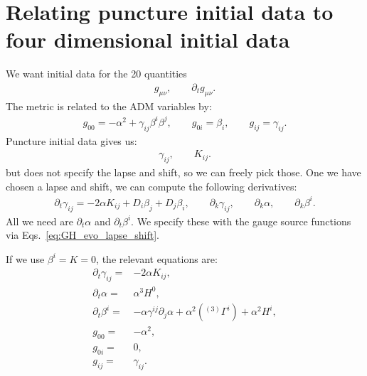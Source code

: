 \documentclass[%
notitlepage,
report,
nofootinbib,
 amsmath,amssymb,
 aps,
]{revtex4-1}
\begin{document}
\section{Relating puncture initial data to four dimensional initial data}
We want initial data for the 20 quantities
\begin{align}
   g_{\mu\nu},\qquad\partial_tg_{\mu\nu}
   .
\end{align}
The metric is related to the ADM variables by:
\begin{subequations}
\begin{align}
   g_{00}
   =
   -  
   \alpha^2
   +
   \gamma_{ij}\beta^i\beta^j
   ,\qquad
   g_{0i}
   =
   \beta_i
   ,\qquad
   g_{ij}
   =
   \gamma_{ij}
   .
\end{align}
\end{subequations}
Puncture initial data gives us:
\begin{align}
   \gamma_{ij},\qquad K_{ij}
   .
\end{align}
but does not specify the lapse and shift, so we can freely pick those.
One we have chosen a lapse and shift, we can compute the following derivatives:
\begin{subequations}
\begin{align}
   \partial_t\gamma_{ij}
   =
   -
   2\alpha K_{ij}
   +
   D_i\beta_j
   +
   D_j\beta_i
   ,\qquad
   \partial_k\gamma_{ij}
   ,\qquad
   \partial_k\alpha
   ,\qquad
   \partial_k\beta^i
   .
\end{align}
\end{subequations}
All we need are $\partial_t\alpha$ and $\partial_t\beta^i$.
We specify these with the gauge source functions via
Eqs.~\eqref{eq:GH_evo_lapse_shift}.

If we use $\beta^i=K=0$, the relevant equations are:
\begin{subequations}
\begin{align}
   \partial_t\gamma_{ij}
   =&
   -
   2\alpha K_{ij}
   ,\\
   \partial_t\alpha
   =&
   \alpha^3H^0
   ,\\
   \partial_t\beta^i
   =&
   -  
   \alpha\gamma^{ij}\partial_j\alpha
   +  
   \alpha^2\left({}^{(3)}\Gamma^i\right)
   +  
   \alpha^2H^i
   ,\\
   g_{00}
   =&
   -
   \alpha^2
   ,\\
   g_{0i}
   =&
   0
   ,\\
   g_{ij}
   =&
   \gamma_{ij}
   .
\end{align}   
\end{subequations}
\end{document}
